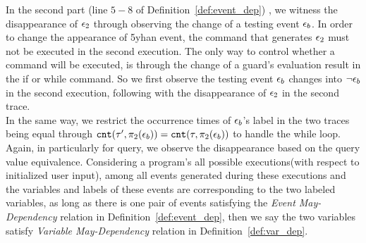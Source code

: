 {%
In the second part (line $5-8$ of Definition~\ref{def:event_dep}) , we 
witness
the disappearance of $\mathtt{\epsilon}_2$ through observing the change of a testing event $\mathtt{\epsilon}_b$.
In order to change the appearance of 
5yhan event, the command that generates $\mathtt{\epsilon}_2$ must not be executed in 
the second execution. 
The only way to control whether a command will be executed, is through the change of a guard's 
evaluation result in the if or while command.
So we first observe the testing event $\mathtt{\epsilon}_b$ changes into $\neg \mathtt{\epsilon}_b$ in the second execution, 
following with the disappearance of $\mathtt{\epsilon}_2$ in the second trace.
\\
In the same way, we restrict the occurrence times of $\mathtt{\epsilon}_b$'s label in the two traces being equal
}
through $\mathtt{cnt}(\mathtt{\tau}', \pi_2(\mathtt{\epsilon}_b)) = \mathtt{cnt}(\mathtt{\tau}, \pi_2(\mathtt{\epsilon}_b)) $ to handle the while loop.
Again, in particularly for query, we observe the disappearance based on the query value equivalence.
%
{Considering a program's all possible executions(with respect to initialized user input),
among all events generated during these executions
and the variables and labels of these events are 
corresponding to the two labeled variables,
as long as there is one pair of events satisfying the \emph{Event May-Dependency} relation in Definition~\ref{def:event_dep}, 
then we say the two variables satisfy \emph{Variable May-Dependency} relation in Definition~\ref{def:var_dep}.
}

